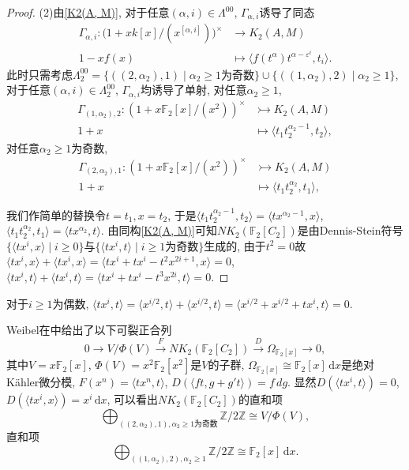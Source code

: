 \begin{proof}
	(2)由\ref{K2(A, M)}, 对于任意$(\alpha, i)\in \Lambda^{00}$, $\Gamma_{\alpha, i}$诱导了同态
 \begin{align*}
 \Gamma_{\alpha, i} \colon \big(1+xk[x]/(x^{[\alpha, i]})\big)^{\times} &\longrightarrow K_2(A, M)\\
 1-xf(x) &\mapsto \langle f(t^\alpha)t^{\alpha-\varepsilon^i}, t_i \rangle. 
 \end{align*}
 此时只需考虑$\Lambda^{00}_2=\{((2, \alpha_2), 1)\mid  \alpha_2\geq 1\text{为奇数}\} \cup \{((1, \alpha_2), 2)\mid  \alpha_2\geq 1\}$, 对于任意$(\alpha, i)\in \Lambda^{00}_2$, $\Gamma_{\alpha, i}$均诱导了单射, 对任意$\alpha_2\geq 1$, 
  \begin{align*}
 \Gamma_{(1, \alpha_2), 2} \colon (1+x \mathbb{F}_2[x]/(x^{2}))^{\times} &\rightarrowtail K_2(A, M)\\
 1+x &\mapsto 
 \langle t_1t_2^{\alpha_2-1}, t_2 \rangle, 
 \end{align*}
对任意$\alpha_2\geq 1$为奇数, 
 \begin{align*}
 \Gamma_{(2, \alpha_2), 1} \colon (1+x \mathbb{F}_2[x]/(x^{2}))^{\times} &\rightarrowtail K_2(A, M)\\
 1+x &\mapsto \langle t_1t_2^{\alpha_2}, t_1 \rangle, 
 \end{align*}

我们作简单的替换令$t=t_1, x=t_2$, 于是$\langle t_1t_2^{\alpha_2-1}, t_2 \rangle = \langle tx^{\alpha_2-1}, x \rangle$, $\langle t_1t_2^{\alpha_2}, t_1 \rangle=\langle t x^{\alpha_2}, t  \rangle$. 由同构\ref{K2(A, M)}可知$NK_2(\mathbb{F}_2[C_2])$是由Dennis-Stein符号$\{\langle tx^i, x \rangle \mid i\geq 0\}$与$\{\langle tx^i, t \rangle \mid i\geq 1\text{为奇数}\}$生成的, 由于$t^2=0$故$\langle tx^i, x \rangle+\langle tx^i, x \rangle=\langle tx^i+tx^i-t^2x^{2i+1}, x \rangle=0$, $\langle tx^i, t \rangle+\langle tx^i, t \rangle=\langle tx^i+tx^i-t^3x^{2i}, t \rangle=0$. 
\end{proof}
\begin{remark}
	对于$i\geq 1\text{为偶数}$, $\langle tx^i, t \rangle=\langle x^{i/2}, t \rangle+\langle x^{i/2}, t \rangle=\langle x^{i/2}+x^{i/2}+tx^i, t \rangle=0$. 
\end{remark}

Weibel在\cite{weibel2009nk0}中给出了以下可裂正合列
	\[0\longrightarrow V/\Phi(V) \overset{F}\longrightarrow NK_2(\mathbb{F}_2[C_2])\overset{D}\longrightarrow \Omega_{\mathbb{F}_2[x]}\longrightarrow 0, \]
其中$V=x \mathbb{F}_2[x]$, $\Phi(V)=x^2 \mathbb{F}_2[x^2]$是$V$的子群, $\Omega_{\mathbb{F}_2[x]}\cong \mathbb{F}_2[x] \, \mathrm{d} x$是绝对K\"{a}hler微分模, $F(x^n)=\langle tx^n, t \rangle$, $D(\langle ft, g+g't \rangle)=f\, dg$. 显然$D(\langle tx^i, t \rangle)=0$, $D(\langle tx^i, x \rangle)=x^i\, \mathrm{d} x$, 可以看出$NK_2(\mathbb{F}_2[C_2])$的直和项
$$\bigoplus_{((2, \alpha_2), 1), \alpha_2\geq 1\text{为奇数}} \mathbb{Z}/2\mathbb{Z} \cong V/\Phi(V),$$ 
直和项
$$\bigoplus_{((1, \alpha_2), 2), \alpha_2\geq 1} \mathbb{Z}/2\mathbb{Z} \cong \mathbb{F}_2[x]\, \mathrm{d} x.$$ 

